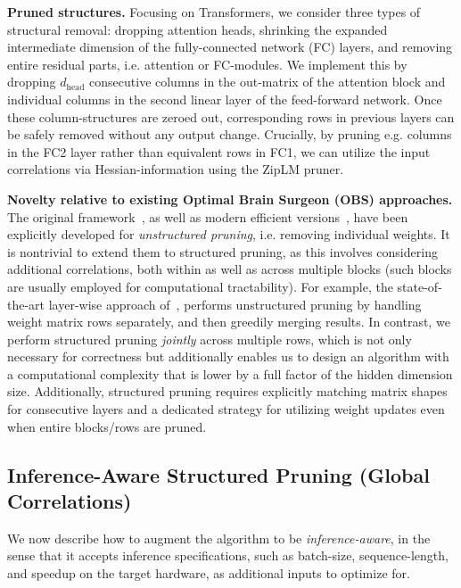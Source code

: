 \documentclass{article}
\theoremstyle{plain}
\theoremstyle{definition}
\theoremstyle{remark}
\renewcommand{\paragraph}[1]{ \noindent \textbf{#1}}
\begin{document}
\paragraph{Pruned structures.} Focusing on Transformers, we consider three types of structural removal: dropping attention heads, shrinking the expanded intermediate dimension of the fully-connected network (FC) layers, and removing entire residual parts, i.e. attention or FC-modules. We implement this by dropping $d_\text{head}$ consecutive columns in the out-matrix of the attention block and individual columns in the second linear layer of the feed-forward network. Once these column-structures are zeroed out, corresponding rows in previous layers can be safely removed without any output change. Crucially, by pruning e.g. columns in the FC2 layer rather than equivalent rows in FC1, we can utilize the input correlations via Hessian-information using the ZipLM pruner.

\paragraph{Novelty relative to existing Optimal Brain Surgeon (OBS) approaches.} 
The original framework~\cite{hassibi1993second}, as well as modern efficient versions~\cite{Singh2020WoodFisherES, Frantar2021EfficientMA, frantar2022obc}, have been explicitly developed for \emph{unstructured pruning}, i.e. removing individual weights.
It is nontrivial to extend them to structured pruning, as this involves considering additional correlations, both within as well as across multiple blocks (such blocks are usually employed for computational tractability). For example, the state-of-the-art layer-wise approach of~\cite{frantar2022obc}, performs unstructured pruning by handling weight matrix rows separately, and then greedily merging results. In contrast, we perform structured pruning \textit{jointly} across multiple rows, which is not only necessary for correctness but additionally enables us to design an algorithm with a computational complexity that is lower by a full factor of the hidden dimension size. Additionally, structured pruning requires explicitly matching matrix shapes for consecutive layers and a dedicated strategy for utilizing weight updates even when entire blocks/rows are pruned.

\subsection{Inference-Aware Structured Pruning (Global Correlations)}
\label{sec:inf-aware}
We now describe how to augment the algorithm to be \emph{inference-aware}, in the sense that it accepts inference specifications, such as batch-size, sequence-length, and speedup on the target hardware, as additional inputs to optimize for.
\end{document}
